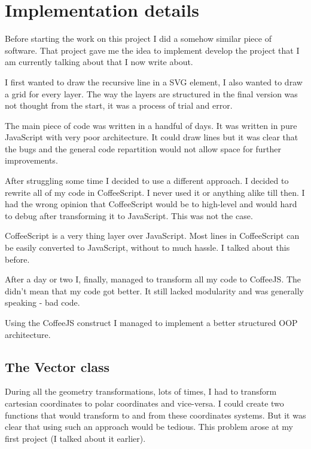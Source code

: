 \section{Implementation details}

    Before starting the work on this project I did a somehow similar piece of software. 
    That project gave me the idea to implement develop the project that I am currently talking about that I now write about.

    I first wanted to draw the recursive line in a SVG element, I also wanted to draw a grid for every layer. 
    The way the layers are structured in the final version was not thought from the start, it was a process of trial and error.

    The main piece of code was written in a handful of days. 
    It was written in pure JavaScript with very poor architecture. 
    It could draw lines but it was clear that the bugs and the general code repartition would not allow space for further improvements. 

    After struggling some time I decided to use a different approach.
    I decided to rewrite all of my code in CoffeeScript. I never used it or anything alike till then. 
    I had the wrong opinion that CoffeeScript would be to high-level and would hard to debug after transforming it to JavaScript. 
    This was not the case.

    CoffeeScript is a very thing layer over JavaScript.
    Most lines in CoffeeScript can be easily converted to JavaScript, without to much hassle.
    I talked about this before.

    After a day or two I, finally, managed to transform all my code to CoffeeJS.
    The didn't mean that my code got better.
    It still lacked modularity and was generally speaking - bad code.

    Using the CoffeeJS  construct I managed to implement a better structured OOP architecture.

    \subsection{The Vector class}

        During all the geometry transformations, lots of times, I had to transform cartesian coordinates to polar coordinates and vice-versa.
        I could create two functions that would transform to and from these coordinates systems.
        But it was clear that using such an approach would be tedious.
        This problem arose at my first project (I talked about it earlier).

